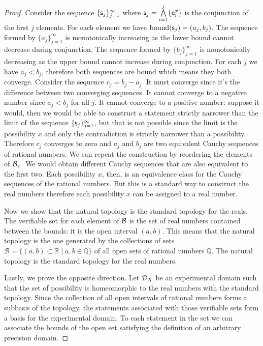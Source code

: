\documentclass[11pt,letterpaper,fleqn]{memoir} %
\begin{document}
\begin{mathSection}
\begin{proof}
		Consider the sequence $\{\stmt_j\}_{j=1}^{\infty}$ where $\stmt_j = \bigAND\limits_{i=1}^j\{\obs[e]^x_i\}$ is the conjunction of the first $j$ elements. For each element we have $\operatorname{bound}(\stmt_j) = (a_j, b_j)$. The sequence formed by $\{a_j\}_{j=1}^{\infty}$ is monotonically increasing as the lower bound cannot decrease during conjunction. The sequence formed by $\{b_j\}_{j=1}^{\infty}$ is monotonically decreasing as the upper bound cannot increase during conjunction. For each $j$ we have $a_j < b_j$, therefore both sequences are bound which means they both converge. Consider the sequence $c_j = b_j - a_j$. It must converge since it's the difference between two converging sequences. It cannot converge to a negative number since $a_j < b_j$ for all $j$. It cannot converge to a positive number: suppose it would, then we would be able to construct a statement strictly narrower than the limit of the sequence $\{\stmt_j\}_{j=1}^{\infty}$, but that is not possible since the limit is the possibility $x$ and only the contradiction is strictly narrower than a possibility. Therefore $c_j$ converges to zero and $a_j$ and $b_j$ are two equivalent Cauchy sequences of rational numbers. We can repeat the construction by reordering the elements of $\basis_x$. We would obtain different Cauchy sequences that are also equivalent to the first two. Each possibility $x$, then, is an equivalence class for the Cauchy sequences of the rational numbers. But this is a standard way to construct the real numbers therefore each possibility $x$ can be assigned to a real number.
		
		Now we show that the natural topology is the standard topology for the reals. The verifiable set for each element of $\basis$ is the set of real numbers contained between the bounds: it is the open interval $(a,b)$. This means that the natural topology is the one generated by the collections of sets $\mathcal{B} = \{ (a,b) \subset \mathbb{R} \; | \; a,b \in \mathbb{Q} \}$ of all open sets of rational numbers $\mathbb{Q}$. The natural topology is the standard topology for the real numbers.
		
		Lastly, we prove the opposite direction. Let $\edomain_X$ be an experimental domain such that the set of possibility is homeomorphic to the real numbers with the standard topology. Since the collection of all open intervals of rational numbers forms a subbasis of the topology, the statements associated with those verifiable sets form a basis for the experimental domain. To each statement in the set we can associate the bounds of the open set satisfying the definition of an arbitrary precision domain.
	\end{proof}
	

\end{mathSection}
\end{document}

